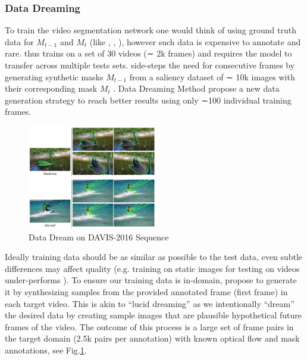 \subsubsection{Data Dreaming}
To train the video segmentation network one would think of using ground truth data for $M_{t−1}$ and $M_t$ (like \cite{OSVOS}, \cite{bertinetto2016fully}, \cite{held2016learning}), however such data is expensive to annotate and rare. \cite{OSVOS} thus trains on a set of 30 videos (∼ 2k frames) and requires the model to transfer across multiple tests sets. \cite{Perazzi2017Learning} side-steps the need for consecutive frames by generating synthetic masks $M_{t-1}$ from a saliency dataset of ∼ 10k images with their corresponding mask $M_t$ . Data Dreaming Method\cite{LucidTracker} propose a new data generation strategy to reach better results using only ∼100 individual training frames.

\begin{figure}[ht]
    \centering
    \includegraphics[width=0.5\textwidth]{./figure/data_dream.png}
    \caption{Data Dream on DAVIS-2016 Sequence}
    \label{data dream}
\end{figure}


Ideally training data should be as similar as possible to the test data, even subtle differences may affect quality (e.g. training on static images for testing on videos under-performs \cite{tang2012shifting}). To ensure our training data is in-domain, \cite{LucidTracker} propose to generate it by synthesizing samples from the provided annotated frame (first frame) in each target video. This is akin to “lucid dreaming” as we intentionally “dream” the desired data by creating sample images that are plausible hypothetical future frames of the video. The outcome of this process is a large set of frame pairs in the target domain (2.5k pairs per annotation) with known optical flow and mask annotations, see Fig.\ref{data dream}.

